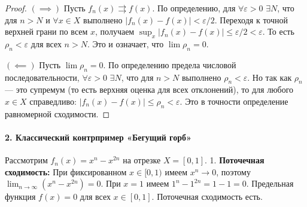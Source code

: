 \begin{proof}
$(\implies)$ Пусть $f_n(x) \rightrightarrows f(x)$. По определению, для $\forall \varepsilon > 0 \,\, \exists N$, что для $n > N$ и $\forall x \in X$ выполнено $|f_n(x) - f(x)| < \varepsilon/2$. Переходя к точной верхней грани по всем $x$, получаем $\sup_{x} |f_n(x) - f(x)| \le \varepsilon/2 < \varepsilon$. То есть $\rho_n < \varepsilon$ для всех $n > N$. Это и означает, что $\lim \rho_n = 0$.

$(\impliedby)$ Пусть $\lim \rho_n = 0$. По определению предела числовой последовательности, $\forall \varepsilon > 0 \,\, \exists N$, что для $n > N$ выполнено $\rho_n < \varepsilon$. Но так как $\rho_n$ — это супремум (то есть верхняя оценка для всех отклонений), то для любого $x \in X$ справедливо: $|f_n(x) - f(x)| \le \rho_n < \varepsilon$. Это в точности определение равномерной сходимости.
\end{proof}

\paragraph{2. Классический контрпример «Бегущий горб»}
Рассмотрим $f_n(x) = x^n - x^{2n}$ на отрезке $X = [0, 1]$.
1. \textbf{Поточечная сходимость:} 
При фиксированном $x \in [0, 1)$ имеем $x^n \to 0$, поэтому $\lim_{n \to \infty} (x^n - x^{2n}) = 0$.
При $x = 1$ имеем $1^n - 1^{2n} = 1 - 1 = 0$.
Предельная функция $f(x) = 0$ для всех $x \in [0, 1]$. Поточечная сходимость есть.

